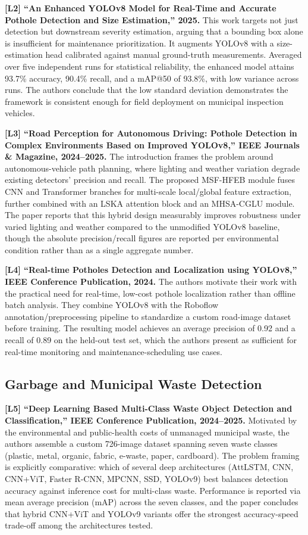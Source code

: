 \documentclass[conference]{IEEEtran}
\begin{document}
\textbf{[L2] ``An Enhanced YOLOv8 Model for Real-Time and Accurate Pothole Detection and Size Estimation,'' 2025.} This work targets not just detection but downstream severity estimation, arguing that a bounding box alone is insufficient for maintenance prioritization. It augments YOLOv8 with a size-estimation head calibrated against manual ground-truth measurements. Averaged over five independent runs for statistical reliability, the enhanced model attains 93.7\% accuracy, 90.4\% recall, and a mAP@50 of 93.8\%, with low variance across runs. The authors conclude that the low standard deviation demonstrates the framework is consistent enough for field deployment on municipal inspection vehicles.

\textbf{[L3] ``Road Perception for Autonomous Driving: Pothole Detection in Complex Environments Based on Improved YOLOv8,'' IEEE Journals \& Magazine, 2024--2025.} The introduction frames the problem around autonomous-vehicle path planning, where lighting and weather variation degrade existing detectors' precision and recall. The proposed MSF-HFEB module fuses CNN and Transformer branches for multi-scale local/global feature extraction, further combined with an LSKA attention block and an MHSA-CGLU module. The paper reports that this hybrid design measurably improves robustness under varied lighting and weather compared to the unmodified YOLOv8 baseline, though the absolute precision/recall figures are reported per environmental condition rather than as a single aggregate number.

\textbf{[L4] ``Real-time Potholes Detection and Localization using YOLOv8,'' IEEE Conference Publication, 2024.} The authors motivate their work with the practical need for real-time, low-cost pothole localization rather than offline batch analysis. They combine YOLOv8 with the Roboflow annotation/preprocessing pipeline to standardize a custom road-image dataset before training. The resulting model achieves an average precision of 0.92 and a recall of 0.89 on the held-out test set, which the authors present as sufficient for real-time monitoring and maintenance-scheduling use cases.

\subsection{Garbage and Municipal Waste Detection}

\textbf{[L5] ``Deep Learning Based Multi-Class Waste Object Detection and Classification,'' IEEE Conference Publication, 2024--2025.} Motivated by the environmental and public-health costs of unmanaged municipal waste, the authors assemble a custom 726-image dataset spanning seven waste classes (plastic, metal, organic, fabric, e-waste, paper, cardboard). The problem framing is explicitly comparative: which of several deep architectures (AttLSTM, CNN, CNN+ViT, Faster R-CNN, MPCNN, SSD, YOLOv9) best balances detection accuracy against inference cost for multi-class waste. Performance is reported via mean average precision (mAP) across the seven classes, and the paper concludes that hybrid CNN+ViT and YOLOv9 variants offer the strongest accuracy-speed trade-off among the architectures tested.
\end{document}
